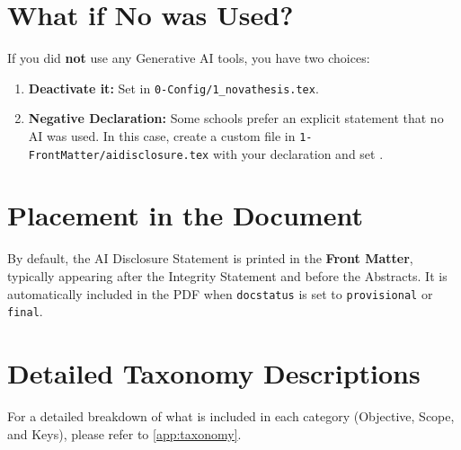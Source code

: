 \section{What if No  was Used?}

If you did \textbf{not} use any Generative \gls{AI} tools, you have two choices:
\begin{enumerate}
  \item \textbf{Deactivate it:} Set  in \verb!0-Config/1_novathesis.tex!.
  \item \textbf{Negative Declaration:} Some schools prefer an explicit statement that no \gls{AI} was used. In this case, create a custom file in \verb!1-FrontMatter/aidisclosure.tex! with your declaration and set .
\end{enumerate}


\section{Placement in the Document}

By default, the \gls{AI} Disclosure Statement is printed in the \textbf{Front Matter}, typically appearing after the Integrity Statement and before the Abstracts. It is automatically included in the PDF when \texttt{docstatus} is set to \texttt{provisional} or \texttt{final}.


\section{Detailed Taxonomy Descriptions}
\label{sec:taxonomy_ref}

For a detailed breakdown of what is included in each category (Objective, Scope, and Keys), please refer to \autoref{app:taxonomy}.
